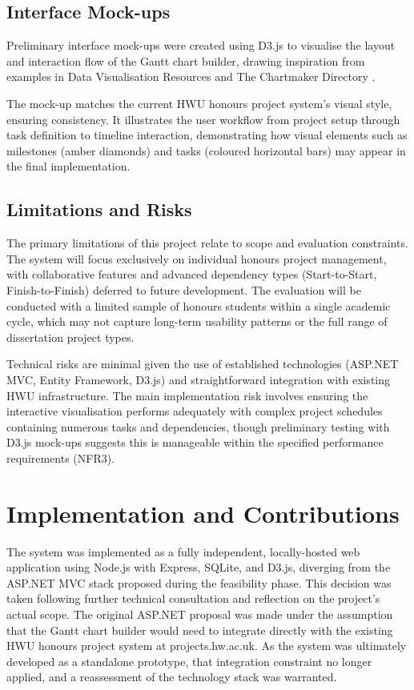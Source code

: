 \documentclass[12pt,nonacm,acmlarge,titlepage,screen]{acmart}
\begin{document}
\subsection{Interface Mock-ups}

Preliminary interface mock-ups were created using D3.js to visualise the layout and interaction flow of the Gantt chart builder, drawing inspiration from examples in Data Visualisation Resources and The Chartmaker Directory \cite{visualisingdata_resources, chartmaker_directory}.

The mock-up matches the current HWU honours project system's visual style, ensuring consistency. It illustrates the user workflow from project setup through task definition to timeline interaction, demonstrating how visual elements such as milestones (amber diamonds) and tasks (coloured horizontal bars) may appear in the final implementation.

\subsection{Limitations and Risks}

The primary limitations of this project relate to scope and evaluation constraints. The system will focus exclusively on individual honours project management, with collaborative features and advanced dependency types (Start-to-Start, Finish-to-Finish) deferred to future development. The evaluation will be conducted with a limited sample of honours students within a single academic cycle, which may not capture long-term usability patterns or the full range of dissertation project types.

Technical risks are minimal given the use of established technologies (ASP.NET MVC, Entity Framework, D3.js) and straightforward integration with existing HWU infrastructure. The main implementation risk involves ensuring the interactive visualisation performs adequately with complex project schedules containing numerous tasks and dependencies, though preliminary testing with D3.js mock-ups suggests this is manageable within the specified performance requirements (NFR3).

\section{Implementation and Contributions} \label{cha:impl_contrib}

The system was implemented as a fully independent, locally-hosted web application using Node.js with Express, SQLite, and D3.js, diverging from the ASP.NET MVC stack proposed during the feasibility phase. This decision was taken following further technical consultation and reflection on the project's actual scope. The original ASP.NET proposal was made under the assumption that the Gantt chart builder would need to integrate directly with the existing HWU honours project system at projects.hw.ac.uk. As the system was ultimately developed as a standalone prototype, that integration constraint no longer applied, and a reassessment of the technology stack was warranted.
\end{document}
